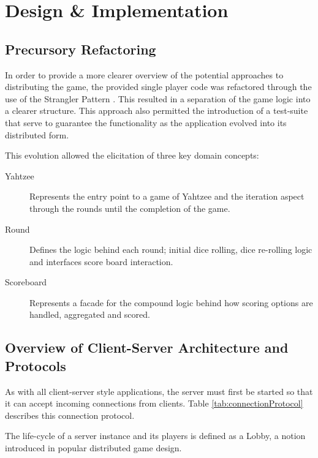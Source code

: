 \section{Design \& Implementation}
\subsection{Precursory Refactoring}

In order to provide a more clearer overview of the potential approaches to distributing the game, the provided single player code was refactored through the use of the Strangler Pattern \parencite{strangler2004}. This resulted in a separation of the game logic into a clearer structure. This approach also permitted the introduction of a test-suite that serve to guarantee the functionality as the application evolved into its distributed form.

This evolution allowed the elicitation of three key domain concepts:

\begin{description}
	\item [Yahtzee]  Represents the entry point to a game of Yahtzee and the iteration aspect through the rounds until the completion of the game.
	\item [Round] Defines the logic behind each round; initial dice rolling, dice re-rolling logic and interfaces score board interaction.
	\item [Scoreboard] Represents a facade for the compound logic behind how scoring options are handled, aggregated and scored.
\end{description}

\subsection{Overview of Client-Server Architecture and Protocols}

As with all client-server style applications, the server must first be started so that it can accept incoming connections from clients. Table \ref{tab:connectionProtocol} describes this connection protocol.

The life-cycle of a server instance and its players is defined as a Lobby, a notion introduced in popular distributed game design.

